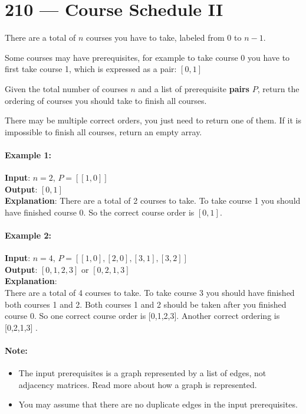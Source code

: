 \section{210 --- Course Schedule II}
There are a total of $n$ courses you have to take, labeled from 0 to $n-1$.
\par
Some courses may have prerequisites, for example to take course 0 you have to first take course 1, which is expressed as a pair: $[0,1]$
\par
Given the total number of courses $n$ and a list of prerequisite \textbf{pairs} $P$, return the ordering of courses you should take to finish all courses.
\par
There may be multiple correct orders, you just need to return one of them. If it is impossible to finish all courses, return an empty array.
\par
\paragraph{Example 1:}
\begin{flushleft}
\textbf{Input}: $n=2$, $P=[[1,0]]$
\\
\textbf{Output}: $[0,1]$
\\
\textbf{Explanation}: There are a total of 2 courses to take. To take course 1 you should have finished  course 0. So the correct course order is $[0,1]$.
\end{flushleft}
\paragraph{Example 2:}
\begin{flushleft}
\textbf{Input}: $n=4$, $P=[[1,0],[2,0],[3,1],[3,2]]$
\\
\textbf{Output}: $[0,1,2,3]$ or $[0,2,1,3]$
\\
\textbf{Explanation}: 
\\
There are a total of 4 courses to take. To take course 3 you should have finished both courses 1 and 2. Both courses 1 and 2 should be taken after you finished course 0. So one correct course order is [0,1,2,3]. Another correct ordering is [0,2,1,3] .
\end{flushleft}
\paragraph{Note:}
\begin{itemize}
    \item The input prerequisites is a graph represented by a list of edges, not adjacency matrices. Read more about how a graph is represented.
    \item You may assume that there are no duplicate edges in the input prerequisites.
\end{itemize}
